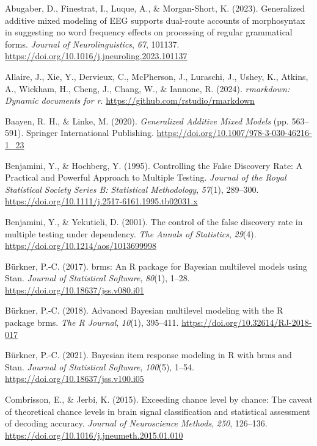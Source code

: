 \documentclass[
  doc,
  floatsintext,
  longtable,
  a4paper,
  nolmodern,
  notxfonts,
  notimes,
  colorlinks=true,linkcolor=blue,citecolor=blue,urlcolor=blue]{apa7}
\newlength{\cslhangindent}
\newenvironment{CSLReferences}[2] %
 {\begin{list}{}{%
  \setlength{\itemindent}{0pt}
  \setlength{\leftmargin}{0pt}
  \setlength{\parsep}{0pt}
  \ifodd #1
   \setlength{\leftmargin}{\cslhangindent}
   \setlength{\itemindent}{-1\cslhangindent}
  \fi
  \setlength{\itemsep}{#2\baselineskip}}}
 {\end{list}}
\begin{document}
\label{refs}
\begin{CSLReferences}{1}{0}
Abugaber, D., Finestrat, I., Luque, A., \& Morgan-Short, K. (2023).
Generalized additive mixed modeling of EEG supports dual-route accounts
of morphosyntax in suggesting no word frequency effects on processing of
regular grammatical forms. \emph{Journal of Neurolinguistics},
\emph{67}, 101137.
\url{https://doi.org/10.1016/j.jneuroling.2023.101137}

Allaire, J., Xie, Y., Dervieux, C., McPherson, J., Luraschi, J., Ushey,
K., Atkins, A., Wickham, H., Cheng, J., Chang, W., \& Iannone, R.
(2024). \emph{{rmarkdown}: Dynamic documents for r}.
\url{https://github.com/rstudio/rmarkdown}

Baayen, R. H., \& Linke, M. (2020). \emph{Generalized Additive Mixed
Models} (pp. 563--591). Springer International Publishing.
\url{https://doi.org/10.1007/978-3-030-46216-1_23}

Benjamini, Y., \& Hochberg, Y. (1995). Controlling the False Discovery
Rate: A Practical and Powerful Approach to Multiple Testing.
\emph{Journal of the Royal Statistical Society Series B: Statistical
Methodology}, \emph{57}(1), 289--300.
\url{https://doi.org/10.1111/j.2517-6161.1995.tb02031.x}

Benjamini, Y., \& Yekutieli, D. (2001). The control of the false
discovery rate in multiple testing under dependency. \emph{The Annals of
Statistics}, \emph{29}(4). \url{https://doi.org/10.1214/aos/1013699998}

Bürkner, P.-C. (2017). {brms}: An {R} package for {Bayesian} multilevel
models using {Stan}. \emph{Journal of Statistical Software},
\emph{80}(1), 1--28. \url{https://doi.org/10.18637/jss.v080.i01}

Bürkner, P.-C. (2018). Advanced {Bayesian} multilevel modeling with the
{R} package {brms}. \emph{The R Journal}, \emph{10}(1), 395--411.
\url{https://doi.org/10.32614/RJ-2018-017}

Bürkner, P.-C. (2021). Bayesian item response modeling in {R} with
{brms} and {Stan}. \emph{Journal of Statistical Software},
\emph{100}(5), 1--54. \url{https://doi.org/10.18637/jss.v100.i05}

Combrisson, E., \& Jerbi, K. (2015). Exceeding chance level by chance:
{The} caveat of theoretical chance levels in brain signal classification
and statistical assessment of decoding accuracy. \emph{Journal of
Neuroscience Methods}, \emph{250}, 126--136.
\url{https://doi.org/10.1016/j.jneumeth.2015.01.010}


\end{CSLReferences}
\end{document}
